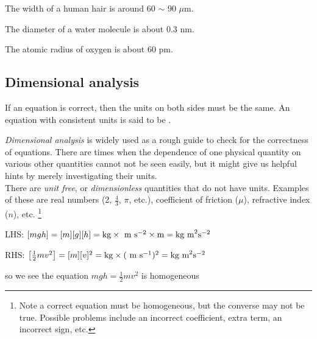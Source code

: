 	The width of a human hair is around 60 $\sim$ 90 $\mu$m.
	
	The diameter of a water molecule is about 0.3 nm.
	
	The atomic radius of oxygen is about 60 pm. 

\subsection{Dimensional analysis}

\begin{ilight}
	If an equation is correct, then the units on both sides must be the same. An equation with consistent units is said to be .
\end{ilight}

\emph{Dimensional analysis} is widely used as a rough guide to check for the correctness of equations. There are times when the dependence of one physical quantity on various other quantities cannot not be seen easily, but it might give us helpful hints by merely investigating their units.\\
There are \emph{unit free}, or \emph{dimensionless} quantities that do not have units. Examples of these are real numbers (2, $\frac{4}{3}$, $\pi$, etc.), coefficient of friction ($\mu$), refractive index ($n$), etc. \footnote{Note a correct equation must be homogeneous, but the converse may not be true. Possible problems include an incorrect coefficient, extra term, an incorrect sign, etc.}

\begin{soln}
 LHS: $[mgh]=[m][g][h] = \text{kg} \times \text{ m s$^{-2}$} \times \text{m} = \text{kg m}^2\text{s}^{-2}$
	
	RHS: $\left[\frac{1}{2}mv^2\right] = [m][v]^2 = \text{kg} \times (\text{ m s$^{-1}$})^2 = \text{kg m}^2\text{s}^{-2}$
	
	so we see the equation $mgh = \frac{1}{2}mv^2$ is homogeneous \end{soln}
	

